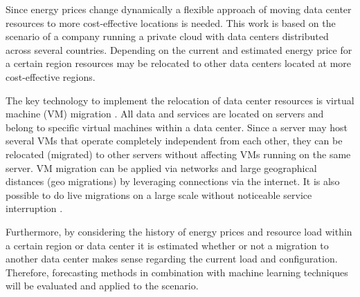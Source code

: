 \documentclass[a4paper]{article}
\begin{document}

Since energy prices change dynamically a flexible approach of moving data center resources to more cost-effective locations is needed. This work is based on the scenario of a company running a private cloud with data centers distributed across several countries. Depending on the current and estimated energy price for a certain region resources may be relocated to other data centers located at more cost-effective regions.

The key technology to implement the relocation of data center resources is virtual machine (VM) migration \cite{nelson2009virtual}. All data and services are located on servers and belong to specific virtual machines within a data center. Since a server may host several VMs that operate completely independent from each other, they can be relocated (migrated) to other servers without affecting VMs running on the same server. VM migration can be applied via networks and large geographical distances (geo migrations) by leveraging connections via the internet. It is also possible to do live migrations on a large scale without noticeable service interruption \cite{celesti2010improving}. 

Furthermore, by considering the history of energy prices and resource load within a certain region or data center it is estimated whether or not a migration to another data center makes sense regarding the current load and configuration. Therefore, forecasting methods in combination with machine learning techniques will be evaluated and applied to the scenario. 
\end{document}
